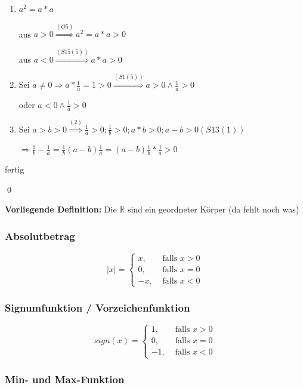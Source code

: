 \documentclass[fleqn]{scrartcl}
\renewenvironment{proof}{{\bfseries Beweis }}{\qed}
\begin{document}
\begin{proof}

\begin{enumerate}
  \item $a^2=a*a$
  
    aus $a>0 \stackrel{(O5)}{\Longrightarrow} a^2=a*a>0$ 
    
    aus $a<0 \stackrel{(S15(5))}{\Longrightarrow} a*a>0$
    
  \item Sei $a \neq 0 \Longrightarrow a*\frac{1}{a} = 1 > 0 \stackrel{(S1(5))}{\Longrightarrow} a>0 \wedge \frac{1}{a}>0$
  
    oder $a<0 \wedge \frac{1}{a}>0$
    
  \item Sei $a>b>0 \stackrel{(2)}{\Longrightarrow} \frac{1}{a}>0;\frac{1}{b}>0;a*b>0;a-b>0 (S13(1))$
  
  $\Longrightarrow \frac{1}{b} - \frac{1}{a} = \frac{1}{b}(a-b)\frac{1}{a}=(a-b)\frac{1}{b}*\frac{1}{a}>0$
\end{enumerate}

fertig

\end{proof}

\textbf{Vorliegende Definition:} Die $\mathbb{R}$ sind ein geordneter Körper (da fehlt noch was)

\subsubsection{Absolutbetrag}

\[
  |x| = \left\{ 
    \begin{array}{rl}
       x, & \text{ falls } x>0 \\
       0, & \text{ falls } x=0\\
      -x, & \text{ falls } x<0
    \end{array}\right.
\]

\subsubsection{Signumfunktion / Vorzeichenfunktion}

\[
  sign(x) = \left\{ 
    \begin{array}{rl}
       1, & \text{ falls } x>0 \\
       0, & \text{ falls } x=0\\
      -1, & \text{ falls } x<0
    \end{array}\right.
\]
\subsubsection{Min- und Max-Funktion}
\end{document}
